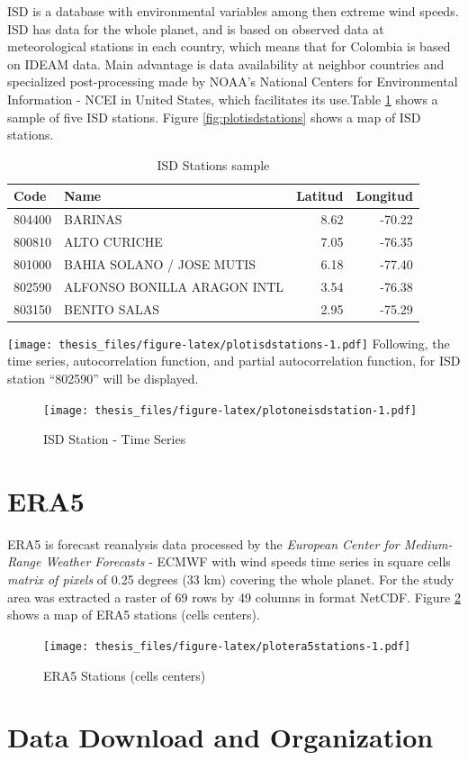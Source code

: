 \documentclass[12pt,oneside]{reedthesis}
\begin{document}
ISD is a database with environmental variables among then extreme wind speeds. ISD has data for the whole planet, and is based on observed data at meteorological stations in each country, which means that for Colombia is based on IDEAM data. Main advantage is data availability at neighbor countries and specialized post-processing made by NOAA's National Centers for Environmental Information - NCEI in United States, which facilitates its use.Table \ref{tab:tableisdstations} shows a sample of five ISD stations. Figure \ref{fig:plotisdstations} shows a map of ISD stations.
\begin{longtable}[t]{llrr}
\caption[ISD Stations]{\label{tab:tableisdstations}ISD Stations sample}\\
\toprule
Code & Name & Latitud & Longitud\\
\midrule
804400 & BARINAS & 8.62 & -70.22\\
800810 & ALTO CURICHE & 7.05 & -76.35\\
801000 & BAHIA SOLANO / JOSE MUTIS & 6.18 & -77.40\\
802590 & ALFONSO BONILLA ARAGON INTL & 3.54 & -76.38\\
803150 & BENITO SALAS & 2.95 & -75.29\\
\bottomrule
\end{longtable}
\texttt{[image: thesis\_files/figure-latex/plotisdstations-1.pdf]}
Following, the time series, autocorrelation function, and partial autocorrelation function, for ISD station ``802590'' will be displayed.
\begin{figure}
\centering
\texttt{[image: thesis\_files/figure-latex/plotoneisdstation-1.pdf]}
\caption{\label{fig:plotoneisdstation}ISD Station - Time Series}
\end{figure}
\hypertarget{era5}{%
\section{ERA5}\label{era5}}

ERA5 is forecast reanalysis data processed by the \emph{European Center for Medium-Range Weather Forecasts} - ECMWF with wind speeds time series in square cells \emph{matrix of pixels} of 0.25 degrees (33 km) covering the whole planet. For the study area was extracted a raster of 69 rows by 49 columns in format NetCDF. Figure \ref{fig:plotera5stations} shows a map of ERA5 stations (cells centers).
\begin{figure}
\centering
\texttt{[image: thesis\_files/figure-latex/plotera5stations-1.pdf]}
\caption{\label{fig:plotera5stations}ERA5 Stations (cells centers)}
\end{figure}
\hypertarget{data-download-and-organization}{%
\section{Data Download and Organization}\label{data-download-and-organization}}
\end{document}
